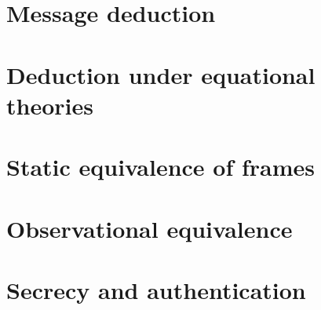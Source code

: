 \documentclass{article}
\begin{document}
    \section{Message deduction}
    

    \section{Deduction under equational theories}
    

    \section{Static equivalence of frames}
    

    \section{Observational equivalence}
    

    \section{Secrecy and authentication}
    
\end{document}
